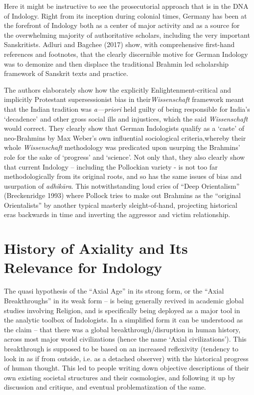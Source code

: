 Here it might be instructive to see the prosecutorial approach that is in the DNA of Indology. Right from its inception during colonial times, Germany has been at the forefront of Indology both as a center of major activity and as a source for the overwhelming majority of authoritative scholars, including the very important Sanskritists. Adluri and Bagchee (2017) show, with comprehensive first-hand references and footnotes, that the clearly discernible motive for German Indology was to demonize and then displace the traditional Brahmin led scholarship framework of Sanskrit texts and practice.

The authors elaborately show how the explicitly Enlightenment-\break critical and implicitly Protestant supersessionist bias in their\break \textit{Wissenschaft} framework meant that the Indian tradition was \textit{a---priori} held guilty of being responsible for India’s ‘decadence’ and other gross social ills and injustices, which the said \textit{Wissenschaft} would correct. They clearly show that German Indologists qualify as a ‘caste’ of neo-Brahmins by Max Weber’s own influential sociological criteria,\break whereby their whole \textit{Wissenschaft} methodology was predicated upon usurping the Brahmins’ role for the sake of ‘progress’ and ‘science’. Not only that, they also clearly show that current Indology – including the Pollockian variety - is not too far methodologically from its original roots, and so has the same issues of bias and usurpation of \textit{adhikāra}. This notwithstanding loud cries of “Deep Orientalism” (Breckenridge 1993) where Pollock tries to make out Brahmins as the “original Orientalists” by another typical masterly sleight-of-hand, projecting historical eras backwards in time and inverting the aggressor and victim relationship.


\section*{History of Axiality and Its Relevance for Indology}

The quasi hypothesis of the “Axial Age” in its strong form, or the “Axial Breakthroughs” in its weak form – is being generally revived in academic global studies involving Religion, and is specifically being deployed as a major tool in the analytic toolbox of Indologists. In a simplified form it can be understood as the claim – that there was a global breakthrough/disruption in human history, across most major world civilizations (hence the name ‘Axial civilizations’). This breakthrough is supposed to be based on an increased reflexivity (tendency to look in as if from outside, i.e. as a detached observer) with the historical progress of human thought. This led to people writing down objective descriptions of their own existing societal structures and their cosmologies, and following it up by discussion and critique, and eventual problematization of the same.

